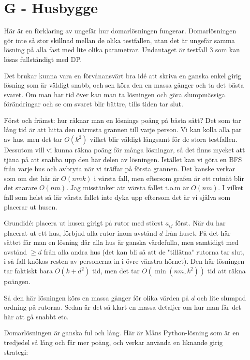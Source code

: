 \section*{G - Husbygge}

Här är en förklaring av ungefär hur domarlösningen fungerar. Domarlösningen gör inte så stor skillnad mellan de olika testfallen, utan det är ungefär samma lösning på alla fast med lite olika parametrar. Undantaget är testfall 3 som kan lösas fullständigt med DP.

Det brukar kunna vara en förvånansvärt bra idé att skriva en ganska enkel girig lösning som är väldigt snabb, och sen köra den en massa gånger och ta det bästa svaret. Om man har tid över kan man ta lösningen och göra slumpmässiga förändringar och se om svaret blir bättre, tills tiden tar slut.

Först och främst: hur räknar man en lösnings poäng på bästa sätt? Det som tar lång tid är att hitta den närmsta grannen till varje person. Vi kan kolla alla par av hus, men det tar $O(k^2)$ vilket blir väldigt långsamt för de stora testfallen. Dessutom vill vi kunna räkna poäng för många lösningar, så det finns mycket att tjäna på att snabba upp den här delen av lösningen. Istället kan vi göra en BFS från varje hus och avbryta när vi träffar på första grannen. Det kanske verkar som om det här är $O(nmk)$ i värsta fall, men eftersom grafen är ett rutnät blir det snarare $O(nm)$. Jag misstänker att värsta fallet t.o.m är $O(nm)$. I vilket fall som helst så lär värsta fallet inte dyka upp eftersom det är vi själva som placerar ut husen.

Grundidé: placera ut husen girigt på rutor med störst $a_{ij}$ först. När du har placerat ut ett hus, förbjud alla rutor inom avstånd $d$ från huset. På det här sättet får man en lösning där alla hus är ganska värdefulla, men samtidigt med avstånd $\geq d$ från alla andra hus (det kan bli så att de "tillåtna" rutorna tar slut, i så fall knökas resten av personerna in i övre vänstra hörnet). Den här lösningen tar faktiskt bara $O(k+d^2)$ tid, men det tar $O(\min(nm,k^2))$ tid att räkna poängen.

Så den här lösningen körs en massa gånger för olika värden på $d$ och lite slumpad ordning på rutorna. Sedan är det så klart en massa detaljer om hur man får det här att gå snabbt etc.

Domarlösningen är ganska ful och lång. Här är Måns Python-lösning som är en tredjedel så lång och får mer poäng, och verkar använda en liknande girig strategi:


